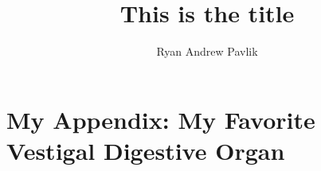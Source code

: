 \documentclass[capstoc,capschap]{rpisudiss}
\title{This is the title}
\author{Ryan Andrew Pavlik}
\begin{document}
\frontmatter

\tableofcontents

\mainmatter %

\appendix

\chapter{My Appendix: My Favorite Vestigal Digestive Organ}
\blindtext
\end{document}

